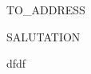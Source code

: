 \documentclass[]{letter}
\begin{document}

\begin{letter}{TO\_ADDRESS}
\address{ADDRESS}

\opening{SALUTATION}




\signature{dfdfd}

\closing{dfdf}


\end{letter}
\end{document}
